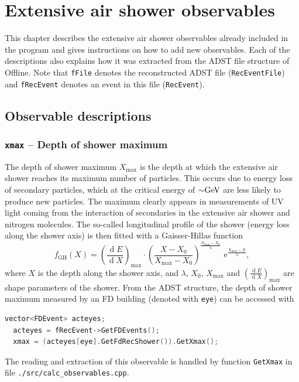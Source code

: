\documentclass[12pt,a4paper]{report}
\newcommand{\diff}{\operatorname{d}\!}	%
\newcommand{\me}{\, \mathrm{e}}	%
\begin{document}
\chapter{Extensive air shower observables} \label{ch:observables}
{\noindent}This chapter describes the extensive air shower observables already included in the program and gives instructions on how to add new observables. Each of the descriptions also explains how it was extracted from the ADST file structure of Offline. Note that \texttt{fFile} denotes the reconstructed ADST file (\texttt{RecEventFile}) and \texttt{fRecEvent} denotes an event in this file (\texttt{RecEvent}).

\section{Observable descriptions}

\subsection{\texttt{xmax} -- Depth of shower maximum}
The depth of shower maximum $X_{\textrm{max}}$ is the depth at which the extensive air shower reaches its maximum number of particles. This occurs due to energy loss of secondary particles, which at the critical energy of ${\sim}\unit[]{GeV}$ are less likely to produce new particles. The maximum clearly appears in measurements of UV light coming from the interaction of secondaries in the extensive air shower and nitrogen molecules. The so-called longitudinal profile of the shower (energy loss along the shower axis) is then fitted with a Gaisser-Hillas function
\begin{equation}\label{eq:gaisserHillas}
f_{\textrm{GH}}(X) = \left(\frac{\diff E}{\diff X}\right)_{\textrm{max}}\cdot \left(\frac{X - X_0}{X_{\textrm{max}} - X_0}\right)^{\frac{X_{\textrm{max}} - X_0}{\lambda}}\, \me^{\frac{X_{\textrm{max}} - X}{\lambda}},
\end{equation}
where $X$ is the depth along the shower axis, and $\lambda$, $X_0$, $X_{\textrm{max}}$ and $\left(\frac{\diff E}{\diff X}\right)_{\textrm{max}}$ are shape parameters of the shower. From the ADST structure, the depth of shower maximum measured by an FD building (denoted with \texttt{eye}) can be accessed with
\begin{lstlisting}[language=C++]
  vector<FDEvent> acteyes;
  acteyes = fRecEvent->GetFDEvents();
  xmax = (acteyes[eye].GetFdRecShower()).GetXmax();
\end{lstlisting}
The reading and extraction of this observable is handled by function \texttt{GetXmax} in file \texttt{./src/calc\_observables.cpp}.
\end{document}
